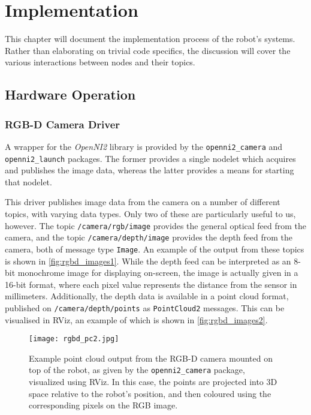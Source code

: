 \chapter{Implementation}
\label{chap:implementation}


This chapter will document the implementation process of the robot's systems. Rather than elaborating on trivial code specifics, the discussion will cover the various interactions between nodes and their topics.


\section{Hardware Operation}

\subsection{RGB-D Camera Driver}

A wrapper for the \emph{OpenNI2} library is provided by the \texttt{openni2\_camera} \cite{ros_wiki_openni2_camera} and \texttt{openni2\_launch} \cite{ros_wiki_openni2_launch} packages. The former provides a single nodelet which acquires and publishes the image data, whereas the latter provides a means for starting that nodelet.

This driver publishes image data from the camera on a number of different topics, with varying data types. Only two of these are particularly useful to us, however. The topic \texttt{/camera/rgb/image} provides the general optical feed from the camera, and the topic \texttt{/camera/depth/image} provides the depth feed from the camera, both of message type \texttt{Image}. An example of the output from these topics is shown in \autoref{fig:rgbd_images1}. While the depth feed can be interpreted as an 8-bit monochrome image for displaying on-screen, the image is actually given in a 16-bit format, where each pixel value represents the distance from the sensor in millimeters. Additionally, the depth data is available in a point cloud format, published on \texttt{/camera/depth/points} as \texttt{PointCloud2} messages. This can be visualised in RViz, an example of which is shown in \autoref{fig:rgbd_images2}.

\begin{figure}[!h]
    \centering
    \texttt{[image: rgbd\_pc2.jpg]}
    \caption{Example point cloud output from the RGB-D camera mounted on top of the robot, as given by the \texttt{openni2\_camera} package, visualized using RViz. In this case, the points are projected into 3D space relative to the robot's position, and then coloured using the corresponding pixels on the RGB image.}
    \label{fig:rgbd_images2}
\end{figure}

